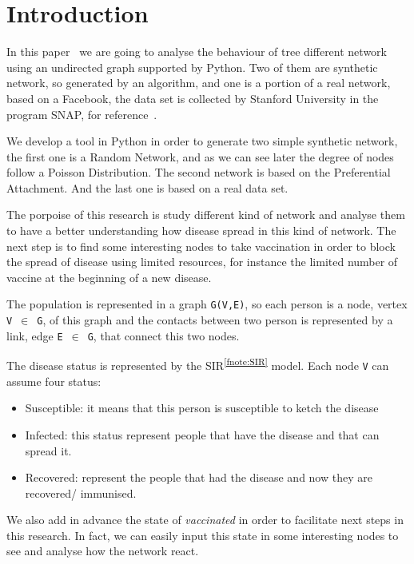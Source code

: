 
\section{Introduction}
    In this paper~\cite{thisPaper} we are going to analyse the behaviour of tree different network using an undirected graph supported by Python.
    Two of them are synthetic network, so generated by an algorithm, and one is a portion of a real network, based on a Facebook, the data set is collected by Stanford University in the program SNAP, for reference~\cite{McAuley:2012:LDS:2999134.2999195}.
  
    We develop a tool in Python in order to generate two simple synthetic network, the first one is a Random Network, and as we can see later the degree of nodes follow a Poisson Distribution.
    The second network is based on the Preferential Attachment.
    And the last one is based on a real data set.
  
    The porpoise of this research is study different kind of network and analyse them to have a better understanding how disease spread in this kind of network.
    The next step is to find some interesting nodes to take vaccination in order to block the spread of disease using limited resources, for instance the limited number of vaccine at the beginning of a new disease.
  
    The population is represented in a graph \verb|G(V,E)|, so each person is a node, vertex \verb|V|~$\in$~\verb|G|, of this graph and the contacts between two person is represented by a link, edge \verb|E|~$\in$~\verb|G|, that connect this two nodes.
  
    The disease status is represented by the SIR\textsuperscript{\ref{fnote:SIR}} model.
    Each node \verb|V| can assume four status:
    \begin{itemize}
      \item Susceptible: it means that this person is susceptible to ketch the disease
      \item Infected: this status represent people that have the disease and that can spread it.
      \item Recovered: represent the people that had the disease and now they are recovered/ immunised.
    \end{itemize}

    We also add in advance the state of \textit{vaccinated} in order to facilitate next steps in this research.
    In fact, we can easily input this state in some interesting nodes to see and analyse how the network react.

